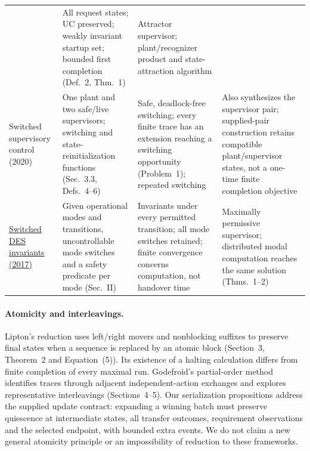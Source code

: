\documentclass[11pt]{article}
\begin{document}
\begin{table}[!htbp]
\begin{tabular}{@{}>{\raggedright\arraybackslash}p{.15\linewidth}>{\raggedright\arraybackslash}p{.28\linewidth}>{\raggedright\arraybackslash}p{.29\linewidth}>{\raggedright\arraybackslash}p{.23\linewidth}@{}}
& All request states; UC preserved; weakly invariant startup set; bounded first completion (Def.~2, Thm.~1)
& Attractor supervisor; plant/recognizer product and state-attraction algorithm\\
Switched supervisory control (2020)
& One plant and two safe/live supervisors; switching and state-reinitialization functions (Sec.~3.3, Defs.~4--6)
& Safe, deadlock-free switching; every finite trace has an extension reaching a switching opportunity (Problem~1); repeated switching
& Also synthesizes the supervisor pair; supplied-pair construction retains compatible plant/supervisor states, not a one-time finite completion objective\\
\href{main.pdf#cite.ReveliotisFei2017SwitchedDES}{Switched DES invariants (2017)}
& Given operational modes and transitions, uncontrollable mode switches and a safety predicate per mode (Sec.~II)
& Invariants under every permitted transition; all mode switches retained; finite convergence concerns computation, not handover time
& Maximally permissive supervisor; distributed modal computation reaches the same solution (Thms.~1--2)\\
\bottomrule
\end{tabular}
\end{table}

\paragraph{Atomicity and interleavings.}
Lipton's reduction uses left/right movers and nonblocking suffixes to preserve final states when a sequence is replaced by an atomic block (Section~3, Theorem~2 and Equation~(5)). Its existence of a halting calculation differs from finite completion of every maximal run. Godefroid's partial-order method identifies traces through adjacent independent-action exchanges and explores representative interleavings (Sections~4--5). Our serialization propositions address the supplied update contract: expanding a winning batch must preserve quiescence at intermediate states, all transfer outcomes, requirement observations and the selected endpoint, with bounded extra events. We do not claim a new general atomicity principle or an impossibility of reduction to these frameworks.
\end{document}
